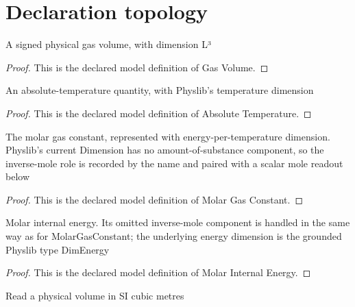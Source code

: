 \section{Declaration topology}
\begin{definition}
  \label{def:physics:phyx-mini-0358:phyxminiproblems-problemphyxmini0358-gasvolume}
  A signed physical gas volume, with dimension L³
\end{definition}
\begin{proof}
  This is the declared model definition of Gas Volume.
\end{proof}
\begin{definition}
  \label{def:physics:phyx-mini-0358:phyxminiproblems-problemphyxmini0358-absolutetemperature}
  An absolute-temperature quantity, with Physlib's temperature dimension
\end{definition}
\begin{proof}
  This is the declared model definition of Absolute Temperature.
\end{proof}
\begin{definition}
  \label{def:physics:phyx-mini-0358:phyxminiproblems-problemphyxmini0358-molargasconstant}
  The molar gas constant, represented with energy-per-temperature dimension. Physlib's current Dimension has no amount-of-substance component, so the inverse-mole role is recorded by the name and paired with a scalar mole readout below
\end{definition}
\begin{proof}
  This is the declared model definition of Molar Gas Constant.
\end{proof}
\begin{definition}
  \label{def:physics:phyx-mini-0358:phyxminiproblems-problemphyxmini0358-molarinternalenergy}
  Molar internal energy. Its omitted inverse-mole component is handled in the same way as for MolarGasConstant; the underlying energy dimension is the grounded Physlib type DimEnergy
\end{definition}
\begin{proof}
  This is the declared model definition of Molar Internal Energy.
\end{proof}
\begin{definition}
  \label{def:physics:phyx-mini-0358:phyxminiproblems-problemphyxmini0358-volumeincubicmeters}
  Read a physical volume in SI cubic metres
\end{definition}
